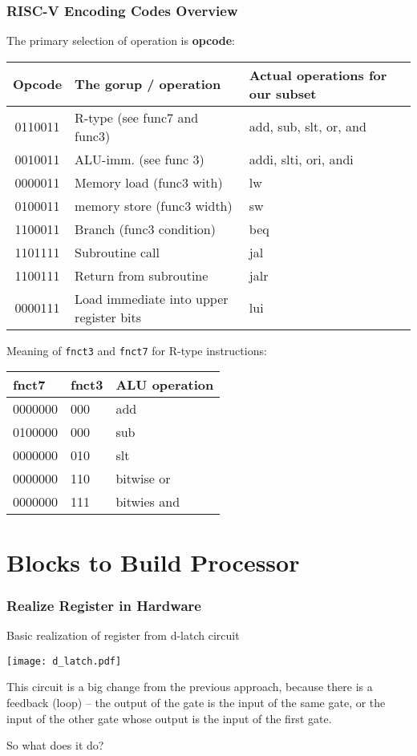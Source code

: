 \documentclass{beamer}
\begin{document}
\begin{frame}
\frametitle{RISC-V Encoding Codes Overview}

The primary selection of operation is \textbf{opcode}:
\begin{table}
\footnotesize
\begin{tabular}{|c|l|l|}\hline
Opcode & The gorup / operation & Actual operations for our subset \\ \hline
0110011 & R-type (see func7 and func3) & add, sub, slt, or, and \\ \hline
0010011 & ALU-imm. (see func 3) & addi, slti, ori, andi \\ \hline
0000011 & Memory load (func3 with) & lw \\ \hline
0100011 & memory store (func3 width) & sw \\ \hline
1100011 & Branch (func3 condition) & beq \\ \hline
1101111 & Subroutine call & jal \\ \hline
1100111 & Return from subroutine & jalr \\ \hline
0000111 & Load immediate into upper register bits & lui \\ \hline
\end{tabular}
\end{table}

Meaning of \texttt{fnct3} and \texttt{fnct7} for R-type instructions:
\begin{table}
\footnotesize
\begin{tabular}{|l|l|l|}\hline
fnct7 & fnct3 & ALU operation \\ \hline
0000000 & 000  & add \\ \hline
0100000 & 000  & sub \\ \hline
0000000 & 010  & slt \\ \hline
0000000 & 110  & bitwise or \\ \hline
0000000 & 111  & bitwies and \\ \hline
\end{tabular}
\end{table}

\end{frame}

\section{Blocks to Build Processor}

\begin{frame}
\frametitle{Realize Register in Hardware}
Basic realization of register from d-latch circuit
\begin{center}
\texttt{[image: d\_latch.pdf]}
\end{center}

This circuit is a big change from the previous approach, because there is a feedback (loop) -- the output of the gate is the input of the same gate, or the input of the other gate whose output is the input of the first gate.

So what does it do?

\end{frame}
\end{document}
